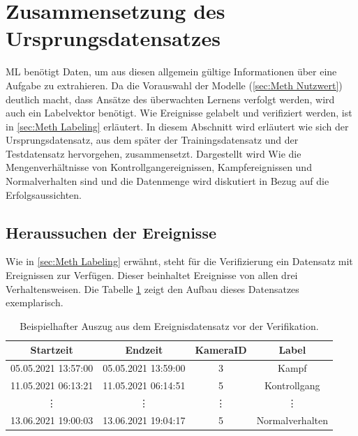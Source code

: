 \section{Zusammensetzung des Ursprungsdatensatzes} \label{sec:Meth Datensatz}
\Gls{ML} benötigt Daten, um aus diesen allgemein gültige Informationen über eine Aufgabe zu extrahieren. Da die Vorauswahl der Modelle (\autoref{sec:Meth Nutzwert}) deutlich macht, dass Ansätze des überwachten Lernens verfolgt werden, wird auch ein \gls{Labelvektor} benötigt. Wie Ereignisse gelabelt und verifiziert werden, ist in \autoref{sec:Meth Labeling} erläutert. In diesem Abschnitt wird erläutert wie sich der Ursprungsdatensatz, aus dem später der Trainingsdatensatz und der Testdatensatz hervorgehen, zusammensetzt. Dargestellt wird Wie die Mengenverhältnisse von Kontrollgangereignissen, Kampfereignissen und Normalverhalten sind und die Datenmenge wird diskutiert in Bezug auf die Erfolgsaussichten. 

\subsection{Heraussuchen der Ereignisse}
Wie in \autoref{sec:Meth Labeling} erwähnt, steht für die Verifizierung ein Datensatz mit Ereignissen zur Verfügen. Dieser beinhaltet Ereignisse von allen drei Verhaltensweisen. Die Tabelle \ref{tab:bspUnvDataSet} zeigt den Aufbau dieses Datensatzes exemplarisch. 


\begin{table}[ht]
    \centering
    \caption{Beispielhafter Auszug aus dem Ereignisdatensatz vor der Verifikation.}
    \begin{tabular}{|c|c|c|c|}
        \hline
        Startzeit & Endzeit & KameraID & Label\\
        \hline
        05.05.2021 13:57:00 & 05.05.2021 13:59:00 & 3       & Kampf\\
        \hline
        11.05.2021 06:13:21 & 11.05.2021 06:14:51 & 5       & Kontrollgang\\
        \hline
        \vdots              & \vdots              & \vdots  & \vdots\\
        \hline
        13.06.2021 19:00:03 & 13.06.2021 19:04:17 & 5       & Normalverhalten\\
        \hline
    \end{tabular}
    \label{tab:bspUnvDataSet}
\end{table}

